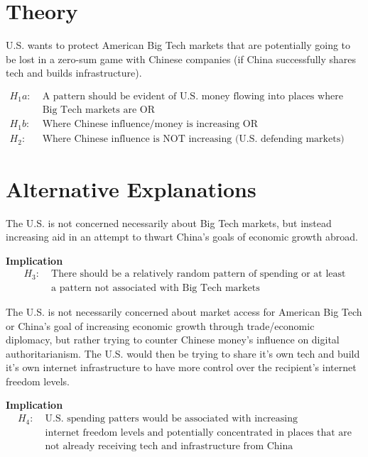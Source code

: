 \section*{Theory} 
U.S. wants to protect American Big Tech markets that are potentially going to be lost in a zero-sum game with Chinese companies (if China successfully shares tech and builds infrastructure).

\begin{align*}
    H_1a:\; & \text{A pattern should be evident of U.S. money flowing into places where either}\\
    & \text{Big Tech markets are OR}\\
    H_1b:\; & \text{Where Chinese influence/money is increasing OR}\\
    H_2:\; & \text{Where Chinese influence is NOT increasing (U.S. defending markets)}
\end{align*}

\section*{Alternative Explanations}
The U.S. is not concerned necessarily about Big Tech markets, but instead increasing aid in an attempt to thwart China's goals of economic growth abroad.

\textbf{Implication}
\begin{align*}
    H_3:\; & \text{There should be a relatively random pattern of spending or at least}\\
    & \text{a pattern not associated with Big Tech markets}
\end{align*}

The U.S. is not necessarily concerned about market access for American Big Tech or China's goal of increasing economic growth through trade/economic diplomacy, but rather trying to counter Chinese money's influence on digital authoritarianism. The U.S. would then be trying to share it's own tech and build it's own internet infrastructure to have more control over the recipient's internet freedom levels.

\textbf{Implication}
\begin{align*}
    H_4:\; & \text{U.S. spending patters would be associated with increasing}\\
    & \text{internet freedom levels and potentially concentrated in places that are}\\
    & \text{not already receiving tech and infrastructure from China}\\
\end{align*}


